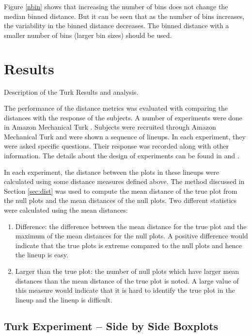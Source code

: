 \documentclass[12]{article}
\begin{document}
Figure \ref{nbin} shows that increasing the number of bins does not change the median binned distance. But it can be seen that as the number of bins increases, the variability in the binned distance decreases. The binned distance with a smaller number of bins (larger bin sizes) should be used.



\section{Results}

{\color{blue} Description of the Turk Results and analysis.}

The performance of the distance metrics was evaluated with comparing the distances with the response of the subjects. A number of experiments were done in Amazon Mechanical Turk \citep{turk}. Subjects were recruited through Amazon Mechanical Turk and were shown a sequence of lineups. In each experiment, they were asked specific questions. Their response was recorded along with other information. The details about the design of experiments can be found in \cite{majumder:2011} and \cite{roychowdhury:2013}. 

In each experiment, the distance between the plots in these lineups were calculated using some distance measures defined above. The method discussed in Section \ref{sec:dist} was used to compute the mean distance of the true plot from the null plots and the mean distances of the null plots. Two different statistics were calculated using the mean distances:
\begin{enumerate}
\item Difference: the difference between the mean distance for the true plot and the maximum of the mean distances for the null plots. A positive difference would indicate that the true plots is extreme compared to the null plots and hence the lineup is easy.
\item Larger than the true plot: the number of null plots which have larger mean distances than the mean distance of the true plot is noted. A large value of this measure would indicate that it is hard to identify the true plot in the lineup and the lineup is difficult.
\end{enumerate}


\subsection{Turk Experiment -- Side by Side Boxplots}
\end{document}
